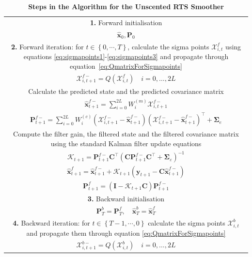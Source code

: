 \documentclass[10pt]{article}
\begin{document}
\renewcommand{\arraystretch}{1.7}
\begin{table}[!ht]
\caption{
\bf{Steps in the Algorithm for the Unscented RTS Smoother}}
\begin{tabular}{|c|}\hline
\multicolumn{1}{|p{16cm}|}{\textbf{1.} Forward initialisation} \\ 
$\hat{\mathbf x}_0, \mathbf P_0$ \\
\hline
\multicolumn{1}{|p{16cm}|}{\textbf{2.} Forward iteration: for $t \in \left\lbrace 0,\cdots, T\right\rbrace $, calculate the sigma points $\mathcal X_{i,t}^f$ using equations \ref{eq:sigmapoints1}-\ref{eq:sigmapoints3} and propagate through equation~\ref{eq:QmatrixForSigmapoints}} \\
$\mathcal X_{i,t+1}^{f-}=Q(\mathcal X_{i,t}^f) \quad i=0, \dots, 2L$\\
\multicolumn{1}{|p{16cm}|}{Calculate the predicted state and the predicted covariance matrix} \\
$\hat{\mathbf x}_{t+1}^{f-}=\sum_{i=0}^{2L} W_i^{(m)}\mathcal X_{i,t+1}^{f-} $ \\
$\mathbf P_{t +1}^{f-}=\sum_{i=0}^{2L} W_i^{(c)}(\mathcal X_{i,t+1}^{f-}-\hat{\mathbf x}_{t +1}^{f-})(\mathcal X_{i,t+1}^{f-}-\hat{\mathbf x}_{t +1}^{f-})^\top+\boldsymbol \Sigma_e$ \\ 
\multicolumn{1}{|p{16cm}|}{Compute the filter gain, the filtered state and the filtered covariance matrix using the standard Kalman filter update equations} \\
$\mathcal K_{t+1}=\mathbf P_{t +1}^{f-}\mathbf C ^\top(\mathbf C \mathbf P_{t +1}^{f-}\mathbf C ^\top+\boldsymbol \Sigma_{\varepsilon})^{-1}$\\
$\hat{\mathbf x}_{t+1}^{f}=\hat{\mathbf x}_{t+1}^{f-}+\mathcal K_{t+1}(\mathbf y_{t+1}-\mathbf C\hat{\mathbf x}_{t +1}^{f-}) $\\
$\mathbf P_{t+1}^f=(\mathbf I - \mathcal K_{t+1}\mathbf C)\mathbf P_{t +1}^{f-}$\\ 
\hline
\multicolumn{1}{|p{16cm}|}{\textbf{3.} Backward initialisation}\\
$\mathbf P_T^b= \mathbf P_T^f, \quad \hat{\mathbf x}^b_T= \hat{\mathbf x}^f_T$ \\
\hline
\multicolumn{1}{|p{16cm}|}{\textbf{4.} Backward iteration: for $t \in \left\lbrace T-1, \cdots, 0 \right\rbrace $ calculate the sigma points $\mathcal X_{i,t}^b$ and propagate them through equation \ref{eq:QmatrixForSigmapoints}}\\
$\mathcal X_{i,t+1}^{b-}=Q(\mathcal X_{i,t}^b) \quad i=0, \dots, 2L$\\

\end{tabular}
\end{table}
\end{document}
